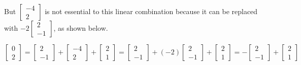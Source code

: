 \documentclass{ximera}
\begin{document}
But $\begin{bmatrix}-4\\2\end{bmatrix}$ is not essential to this linear combination because it can be replaced with $-2\begin{bmatrix}2\\-1\end{bmatrix}$, as shown below.

$$\begin{bmatrix}0\\2\end{bmatrix}=\begin{bmatrix}2\\-1\end{bmatrix}+ \begin{bmatrix}-4\\2\end{bmatrix}+ \begin{bmatrix}2\\1\end{bmatrix}=\begin{bmatrix}2\\-1\end{bmatrix}+ (-2)\begin{bmatrix}2\\-1\end{bmatrix}+ \begin{bmatrix}2\\1\end{bmatrix}=-\begin{bmatrix}2\\-1\end{bmatrix}+ \begin{bmatrix}2\\1\end{bmatrix}$$
\end{document}
